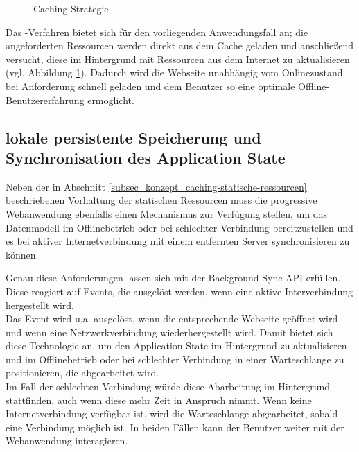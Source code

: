\begin{figure}[htp] 
\caption{Caching Strategie }
\label{image_konzept_caching-strategie}
\end{figure} 

Das -Verfahren bietet sich für den vorliegenden Anwendungsfall an; die angeforderten Ressourcen werden direkt aus dem Cache geladen und anschließend versucht, diese im Hintergrund mit Ressourcen aus dem Internet zu aktualisieren (vgl. Abbildung \ref{image_konzept_caching-strategie}). Dadurch wird die Webseite unabhängig vom Onlinezustand bei Anforderung schnell geladen und dem Benutzer so eine optimale Offline-Benutzererfahrung ermöglicht.

\subsection{lokale persistente Speicherung und Synchronisation des Application State}
\label{subsec_konzeption_caching-modell}

Neben der in Abschnitt \ref{subsec_konzept_caching-statische-ressourcen} beschriebenen Vorhaltung der statischen Ressourcen muss die progressive Webanwendung ebenfalls einen Mechanismus zur Verfügung stellen, um das Datenmodell im Offlinebetrieb oder bei schlechter Verbindung bereitzustellen und es bei aktiver Internetverbindung mit einem entfernten Server synchronisieren zu können.

Genau diese Anforderungen lassen sich mit der Background Sync API erfüllen. Diese reagiert auf Events, die ausgelöst werden, wenn eine aktive Interverbindung hergestellt wird. \\
Das  Event wird u.a. ausgelöst, wenn die entsprechende Webseite geöffnet wird und wenn eine Netzwerkverbindung wiederhergestellt wird. Damit bietet sich diese Technologie an, um den Application State im Hintergrund zu aktualisieren und im Offlinebetrieb oder bei schlechter Verbindung in einer Warteschlange zu positionieren, die abgearbeitet wird. \\
Im Fall der schlechten Verbindung würde diese Abarbeitung im Hintergrund stattfinden, auch wenn diese mehr Zeit in Anspruch nimmt. Wenn keine Internetverbindung verfügbar ist, wird die Warteschlange abgearbeitet, sobald eine Verbindung möglich ist. In beiden Fällen kann der Benutzer weiter mit der Webanwendung interagieren.

